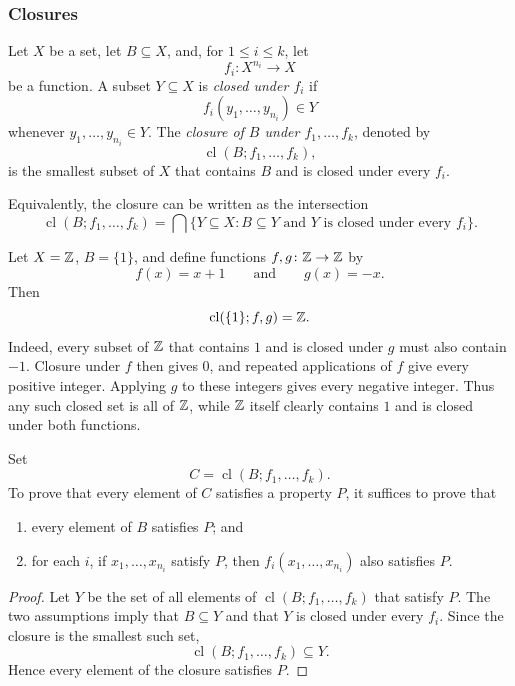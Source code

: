\documentclass[11pt,a4paper]{amsart}
\begin{document}
\subsubsection{Closures}

\begin{definition}[Closure]
  Let \(X\) be a set, let \(B \subseteq X\), and, for \(1 \leq i \leq k\), let
  \[
    f_i\colon X^{n_i} \longrightarrow X
  \]
  be a function. A subset \(Y \subseteq X\) is \emph{closed under \(f_i\)} if
  \[
    f_i(y_1,\ldots,y_{n_i}) \in Y
  \]
  whenever \(y_1,\ldots,y_{n_i} \in Y\). The \emph{closure of \(B\) under
  \(f_1,\ldots,f_k\)}, denoted by
  \[
    \operatorname{cl}(B;f_1,\ldots,f_k),
  \]
  is the smallest subset of \(X\) that contains \(B\) and is closed under
  every \(f_i\).
\end{definition}

Equivalently, the closure can be written as the intersection
\[
  \operatorname{cl}(B;f_1,\ldots,f_k)
  =\bigcap\{Y \subseteq X : B \subseteq Y
  \text{ and \(Y\) is closed under every \(f_i\)}\}.
\]

\begin{example}
  Let \(X=\mathbb{Z}\), \(B=\{1\}\), and define functions \(f,g\colon\mathbb{Z}\to\mathbb{Z}\) by
  \[
    f(x)=x+1
    \qquad\text{and}\qquad
    g(x)=-x.
  \]
  Then
  \[
    \operatorname{cl}(\{1\};f,g)=\mathbb{Z}.
  \]
  Indeed, every subset of \(\mathbb{Z}\) that contains \(1\) and is closed under
  \(g\) must also contain \(-1\). Closure under \(f\) then gives \(0\), and
  repeated applications of \(f\) give every positive integer. Applying \(g\)
  to these integers gives every negative integer. Thus any such closed set is
  all of \(\mathbb{Z}\), while \(\mathbb{Z}\) itself clearly contains \(1\) and is closed
  under both functions.
\end{example}

\begin{corollary}
  Set
  \[
    C=\operatorname{cl}(B;f_1,\ldots,f_k).
  \]
  To prove that every element of \(C\) satisfies a property \(P\), it suffices
  to prove that
  \begin{enumerate}
    \item every element of \(B\) satisfies \(P\); and
    \item for each \(i\), if \(x_1,\ldots,x_{n_i}\) satisfy \(P\), then
      \(f_i(x_1,\ldots,x_{n_i})\) also satisfies \(P\).
  \end{enumerate}
\end{corollary}

\begin{proof}
  Let \(Y\) be the set of all elements of
  \(\operatorname{cl}(B;f_1,\ldots,f_k)\) that satisfy \(P\). The two
  assumptions imply that \(B \subseteq Y\) and that \(Y\) is closed under
  every \(f_i\). Since the closure is the smallest such set,
  \[
    \operatorname{cl}(B;f_1,\ldots,f_k) \subseteq Y.
  \]
  Hence every element of the closure satisfies \(P\).
\end{proof}
\end{document}
